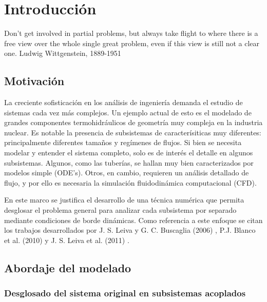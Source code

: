 \chapter{Introducción}
\label{chap1}
\chapterquote
{Don't get involved in partial problems, 
but always take flight to where there is a free view over the whole single great problem, 
even if this view is still not a clear one.}
{Ludwig Wittgenstein, 1889-1951}

\section{Motivación}
\label{1:motivacion}

La creciente sofisticación en los análisis de ingeniería demanda el estudio de sistemas cada vez más complejos.
Un ejemplo actual de esto es el modelado de grandes componentes termohidráulicos de geometría muy compleja en la industria nuclear. 
Es notable la presencia de subsistemas de caracterísiticas muy diferentes: principalmente diferentes tamaños y regímenes de flujos. 
Si bien se necesita modelar y entender el sistema completo, solo es de interés el detalle en algunos subsistemas. 
Algunos, como las tuberías, se hallan muy bien caracterizados por modelos simple (ODE's).
Otros, en cambio, requieren un análisis detallado de flujo, y por ello es necesaria la simulación fluidodinámica computacional (CFD).

En este marco se justifica el desarrollo de una técnica numérica que permita desglosar el problema general 
para analizar cada subsistema por separado mediante condiciones de borde dinámicas.
Como referencia a este enfoque se citan los trabajos desarrollados por J. S. Leiva y G. C. Buscaglia (2006) \cite{coup-0d3d}, P.J. Blanco et al. (2010) \cite{coup-black} y J. S. Leiva et al. (2011) \cite{coup-hyd}.

\section{Abordaje del modelado}
\label{1:abordaje}

\subsection{Desglosado del sistema original en subsistemas acoplados}
\label{1:acoplamiento}


